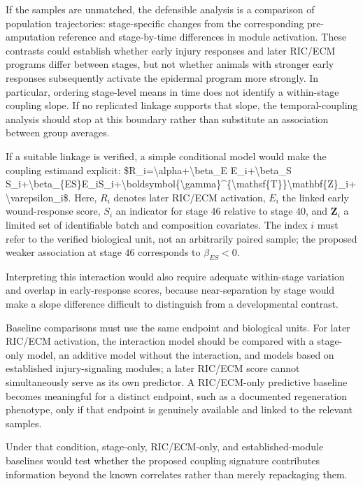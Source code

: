 \documentclass[11pt]{article}
\begin{document}
If the samples are unmatched, the defensible analysis is a comparison of population trajectories: stage-specific changes from the corresponding pre-amputation reference and stage-by-time differences in module activation. These contrasts could establish whether early injury responses and later RIC/ECM programs differ between stages, but not whether animals with stronger early responses subsequently activate the epidermal program more strongly. In particular, ordering stage-level means in time does not identify a within-stage coupling slope. If no replicated linkage supports that slope, the temporal-coupling analysis should stop at this boundary rather than substitute an association between group averages.

If a suitable linkage is verified, a simple conditional model would make the coupling estimand explicit: \$R\_i=\textbackslash{}alpha+\textbackslash{}beta\_E E\_i+\textbackslash{}beta\_S S\_i+\textbackslash{}beta\_\{ES\}E\_iS\_i+\textbackslash{}boldsymbol\{\textbackslash{}gamma\}\textasciicircum{}\{\textbackslash{}mathsf\{T\}\}\textbackslash{}mathbf\{Z\}\_i+\textbackslash{}varepsilon\_i\$. Here, $R_i$ denotes later RIC/ECM activation, $E_i$ the linked early wound-response score, $S_i$ an indicator for stage $46$ relative to stage $40$, and $\mathbf{Z}_i$ a limited set of identifiable batch and composition covariates. The index $i$ must refer to the verified biological unit, not an arbitrarily paired sample; the proposed weaker association at stage $46$ corresponds to $\beta_{ES}<0$.

Interpreting this interaction would also require adequate within-stage variation and overlap in early-response scores, because near-separation by stage would make a slope difference difficult to distinguish from a developmental contrast.

Baseline comparisons must use the same endpoint and biological units. For later RIC/ECM activation, the interaction model should be compared with a stage-only model, an additive model without the interaction, and models based on established injury-signaling modules; a later RIC/ECM score cannot simultaneously serve as its own predictor. A RIC/ECM-only predictive baseline becomes meaningful for a distinct endpoint, such as a documented regeneration phenotype, only if that endpoint is genuinely available and linked to the relevant samples.

Under that condition, stage-only, RIC/ECM-only, and established-module baselines would test whether the proposed coupling signature contributes information beyond the known correlates rather than merely repackaging them.
\end{document}
